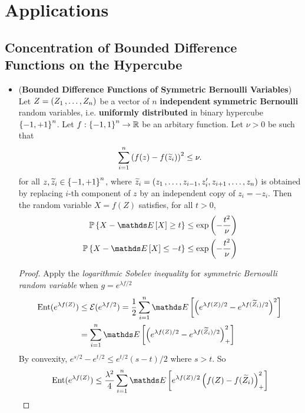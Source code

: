 \documentclass[11pt]{article}
\begin{document}
\section{Applications}
\subsection{Concentration of Bounded Difference Functions on the Hypercube}
\begin{itemize}
\item \begin{proposition} (\textbf{Bounded Difference Functions of Symmetric Bernoulli Variables}) \citep{boucheron2013concentration} \\
Let $Z = (Z_1 \,{,}\ldots{,}\, Z_n)$ be a vector of $n$ \textbf{independent} \textbf{symmetric Bernoulli} random variables, i.e. \textbf{uniformly distributed} in binary hypercube $\left\{-1, +1\right\}^n$.  Let $f : \left\{-1, 1\right\}^n \to {\mathbb R}$ be an arbitary function.  Let $\nu > 0$ be such that
\begin{align*}
\sum_{i=1}^{n}\left(f(z) - f(\widetilde{z}_{i})\right)^2 \le \nu.
\end{align*} for all $z, \widetilde{z}_{i} \in \left\{-1, +1\right\}^n$, where $\widetilde{z}_{i} = (z_1 \,{,}\ldots{,}\, z_{i-1}, z_{i}', z_{i+1} \,{,}\ldots{,}\, z_n)$ is obtained by replacing $i$-th component of  $z$  by an independent copy of $z_{i}= -z_i$. Then the random variable $X = f(Z)$ satisfies, for all $t > 0$,
\begin{align}
\bP\set{X - \E{}{X} \ge t} &\le \exp\paren{-\frac{t^2}{\nu}} \label{ineqn: fun_sym_bernoulli}\\
\bP\set{X - \E{}{X} \le -t} &\le \exp\paren{-\frac{t^2}{\nu}} \nonumber
\end{align}
\end{proposition}
\begin{proof}
Apply the \emph{logarithmic Sobelev inequality} for \emph{symmetric Bernoulli random variable} when $g = e^{\lambda f/2}$
\begin{align*}
\text{Ent}(e^{\lambda f(Z)}) &\le \cE(e^{\lambda f/2}) = \frac{1}{2}\sum_{i=1}^{n}\E{}{\paren{e^{\lambda f(Z) /2} - e^{\lambda f(\widetilde{Z}_{i}) /2}}^2} \\
&= \sum_{i=1}^{n}\E{}{\paren{e^{\lambda f(Z) /2} - e^{\lambda f(\widetilde{Z}_{i}) /2}}_{+}^2} 
\end{align*} By convexity, $e^{s/2} - e^{t/2} \le e^{t/2}(s - t)/2$ where $s > t$. So
\begin{align*}
\text{Ent}(e^{\lambda f(Z)}) &\le \frac{\lambda^2}{4}\sum_{i=1}^{n}\E{}{e^{\lambda f(Z) /2}\paren{f(Z)  - f(\widetilde{Z}_{i})}_{+}^2}\\

\end{align*}
\end{proof}
\end{itemize}
\end{document}
